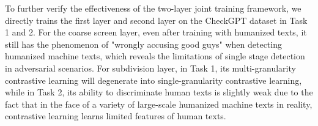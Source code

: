 \documentclass[11pt]{article}
\begin{document}
	\begin{table}[ht]
    \centering
    \caption{Merged results of ablation study. Direct Apply represents results from direct application, Direct Train represents results from direct training.}
    \label{tab:combined_ablation_results}
\end{table}
		
			To further verify the effectiveness of the two-layer joint training framework, we directly trains the first layer and second layer on the CheckGPT dataset in Task 1 and 2. For the coarse screen layer, even after training with humanized texts, it still has the phenomenon of "wrongly accusing good guys" when detecting humanized machine texts, which reveals the limitations of single stage detection in adversarial scenarios. For subdivision layer, in Task 1, its multi-granularity contrastive learning will degenerate into single-granularity contrastive learning, while in Task 2, its ability to discriminate human texts is slightly weak due to the fact that in the face of a variety of large-scale humanized machine texts in reality, contrastive learning learns limited features of human texts.
\end{document}
